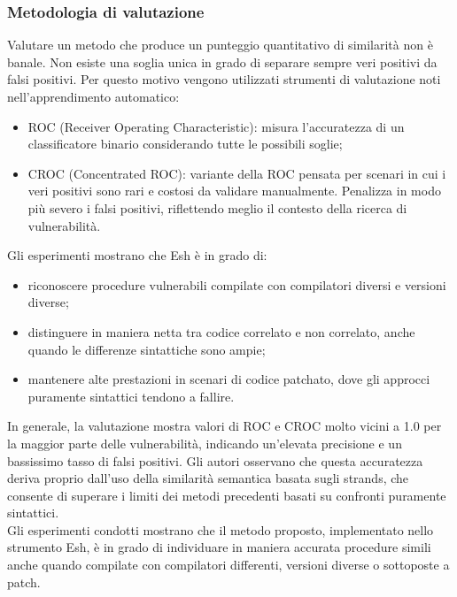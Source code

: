 \documentclass[12pt,a4paper,openright,twoside]{report}
\begin{document}
\subsubsection{Metodologia di valutazione}
Valutare un metodo che produce un punteggio quantitativo di similarità non è banale. Non esiste una soglia unica in grado di separare sempre veri positivi da falsi positivi. Per questo motivo vengono utilizzati strumenti di valutazione noti nell’apprendimento automatico:
\begin{itemize}
    \item ROC (Receiver Operating Characteristic): misura l’accuratezza di un classificatore binario considerando tutte le possibili soglie; 
    \item CROC (Concentrated ROC): variante della ROC pensata per scenari in cui i veri positivi sono rari e costosi da validare manualmente. Penalizza in modo più severo i falsi positivi, riflettendo meglio il contesto della ricerca di vulnerabilità.  
\end{itemize}
Gli esperimenti mostrano che Esh è in grado di:
\begin{itemize}
    \item riconoscere procedure vulnerabili compilate con compilatori diversi e versioni diverse;
    \item distinguere in maniera netta tra codice correlato e non correlato, anche quando le differenze sintattiche sono ampie;
    \item mantenere alte prestazioni in scenari di codice patchato, dove gli approcci puramente sintattici tendono a fallire.  
\end{itemize}
In generale, la valutazione mostra valori di ROC e CROC molto vicini a 1.0 per la maggior parte delle vulnerabilità, indicando un’elevata precisione e un bassissimo tasso di falsi positivi. Gli autori osservano che questa accuratezza deriva proprio dall’uso della similarità semantica basata sugli strands, che consente di superare i limiti dei metodi precedenti basati su confronti puramente sintattici.\\
Gli esperimenti condotti mostrano che il metodo proposto, implementato nello strumento Esh, è in grado di individuare in maniera accurata procedure simili anche quando compilate con compilatori differenti, versioni diverse o sottoposte a patch. 
\end{document}
